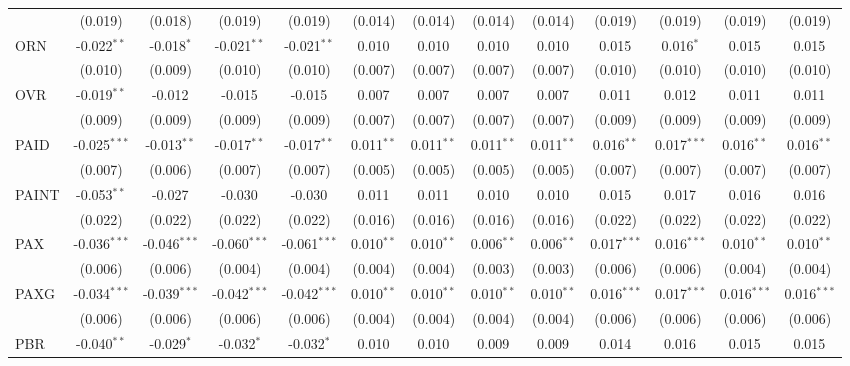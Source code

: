 \begin{table}[!htbp]
\begin{tabular}{@{\extracolsep{5pt}}lcccccccccccc}
  & (0.019) & (0.018) & (0.019) & (0.019) & (0.014) & (0.014) & (0.014) & (0.014) & (0.019) & (0.019) & (0.019) & (0.019) \\
 ORN & -0.022$^{**}$ & -0.018$^{*}$ & -0.021$^{**}$ & -0.021$^{**}$ & 0.010$^{}$ & 0.010$^{}$ & 0.010$^{}$ & 0.010$^{}$ & 0.015$^{}$ & 0.016$^{*}$ & 0.015$^{}$ & 0.015$^{}$ \\
  & (0.010) & (0.009) & (0.010) & (0.010) & (0.007) & (0.007) & (0.007) & (0.007) & (0.010) & (0.010) & (0.010) & (0.010) \\
 OVR & -0.019$^{**}$ & -0.012$^{}$ & -0.015$^{}$ & -0.015$^{}$ & 0.007$^{}$ & 0.007$^{}$ & 0.007$^{}$ & 0.007$^{}$ & 0.011$^{}$ & 0.012$^{}$ & 0.011$^{}$ & 0.011$^{}$ \\
  & (0.009) & (0.009) & (0.009) & (0.009) & (0.007) & (0.007) & (0.007) & (0.007) & (0.009) & (0.009) & (0.009) & (0.009) \\
 PAID & -0.025$^{***}$ & -0.013$^{**}$ & -0.017$^{**}$ & -0.017$^{**}$ & 0.011$^{**}$ & 0.011$^{**}$ & 0.011$^{**}$ & 0.011$^{**}$ & 0.016$^{**}$ & 0.017$^{***}$ & 0.016$^{**}$ & 0.016$^{**}$ \\
  & (0.007) & (0.006) & (0.007) & (0.007) & (0.005) & (0.005) & (0.005) & (0.005) & (0.007) & (0.007) & (0.007) & (0.007) \\
 PAINT & -0.053$^{**}$ & -0.027$^{}$ & -0.030$^{}$ & -0.030$^{}$ & 0.011$^{}$ & 0.011$^{}$ & 0.010$^{}$ & 0.010$^{}$ & 0.015$^{}$ & 0.017$^{}$ & 0.016$^{}$ & 0.016$^{}$ \\
  & (0.022) & (0.022) & (0.022) & (0.022) & (0.016) & (0.016) & (0.016) & (0.016) & (0.022) & (0.022) & (0.022) & (0.022) \\
 PAX & -0.036$^{***}$ & -0.046$^{***}$ & -0.060$^{***}$ & -0.061$^{***}$ & 0.010$^{**}$ & 0.010$^{**}$ & 0.006$^{**}$ & 0.006$^{**}$ & 0.017$^{***}$ & 0.016$^{***}$ & 0.010$^{**}$ & 0.010$^{**}$ \\
  & (0.006) & (0.006) & (0.004) & (0.004) & (0.004) & (0.004) & (0.003) & (0.003) & (0.006) & (0.006) & (0.004) & (0.004) \\
 PAXG & -0.034$^{***}$ & -0.039$^{***}$ & -0.042$^{***}$ & -0.042$^{***}$ & 0.010$^{**}$ & 0.010$^{**}$ & 0.010$^{**}$ & 0.010$^{**}$ & 0.016$^{***}$ & 0.017$^{***}$ & 0.016$^{***}$ & 0.016$^{***}$ \\
  & (0.006) & (0.006) & (0.006) & (0.006) & (0.004) & (0.004) & (0.004) & (0.004) & (0.006) & (0.006) & (0.006) & (0.006) \\
 PBR & -0.040$^{**}$ & -0.029$^{*}$ & -0.032$^{*}$ & -0.032$^{*}$ & 0.010$^{}$ & 0.010$^{}$ & 0.009$^{}$ & 0.009$^{}$ & 0.014$^{}$ & 0.016$^{}$ & 0.015$^{}$ & 0.015$^{}$ \\

\end{tabular}
\end{table}
